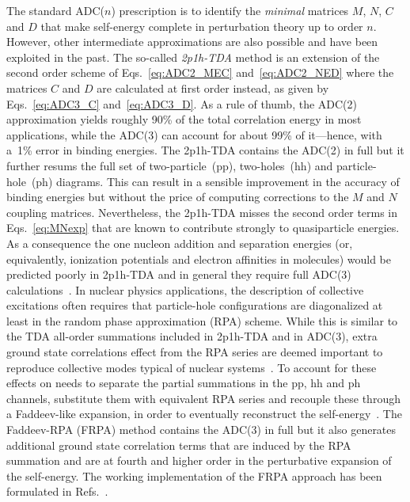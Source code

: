 The standard ADC($n$) prescription is to identify the {\em minimal} matrices  $M$, $N$, $C$ and $D$   that make self-energy  complete in
perturbation theory up to order $n$. However, other intermediate approximations are also possible and have been exploited in the past.
%
The so-called \hbox{\em 2p1h-TDA} method is an extension of the second order scheme of Eqs.~\eqref{eq:ADC2_MEC} and~\eqref{eq:ADC2_NED}  where the matrices $C$ and $D$ are  calculated at first order instead, as given by  Eqs.~\eqref{eq:ADC3_C} and~\eqref{eq:ADC3_D}. As a rule of thumb, the ADC(2)  approximation yields roughly 90\% of the total correlation energy in most applications, while the ADC(3) can account for about 99\% of it---hence, with a~1\% error in binding energies. The 2p1h-TDA  contains the ADC(2) in full but it further resums the full set of two-particle~(pp), two-holes~(hh) and particle-hole~(ph) diagrams. This can result in a sensible improvement in the accuracy of binding energies but without the price of computing corrections to the $M$ and $N$ coupling matrices. Nevertheless, the 2p1h-TDA misses the second order terms in Eqs.~\eqref{eq:MNexp} that are known to contribute strongly to quasiparticle energies. As a consequence the one nucleon addition and separation energies (or, equivalently, ionization potentials and electron affinities in molecules) would be predicted poorly in 2p1h-TDA and in general they require full ADC(3) calculations~\cite{ch11_VonNiessen1984ConPhysRep}.
%
%
In nuclear physics applications, the description of collective excitations often requires that  particle-hole configurations are diagonalized at least in the random phase approximation (RPA) scheme. While this is similar to the TDA all-order summations included in 2p1h-TDA and in ADC(3), extra ground state correlations effect from the RPA series are deemed important to reproduce collective modes typical of nuclear systems~\cite{ch11_RingSchuck}.
%
To account for these effects on needs to separate the partial summations in the pp, hh and ph channels, substitute them with equivalent RPA series and  recouple these through a Faddeev-like expansion, in order to eventually reconstruct the self-energy~\cite{ch11_Danielewicz1994OMP,ch11_Barbieri2001frpa,ch11_Barbieri2003ExO16}.
The Faddeev-RPA (FRPA)  method contains the ADC(3) in full but it also generates additional ground state correlation terms that are induced by the RPA summation and are at fourth and higher order in the perturbative expansion of the self-energy. The working implementation of the FRPA approach has been formulated in Refs.~\cite{ch11_Barbieri2001frpa,ch11_Barbieri2007Atoms,ch11_Degroote2011frpa}.

